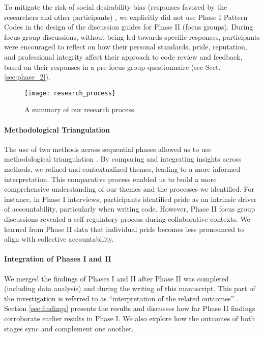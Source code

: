 To mitigate the risk of social desirability bias (responses favored by the researchers and other participants) \citep{furnham1986response}, we explicitly did not use Phase I Pattern Codes in the design of the discussion guides for Phase II (focus groups). During focus group discussions, without being led towards specific responses, participants were encouraged to reflect on how their personal standards, pride, reputation, and professional integrity affect their approach to code review and feedback, based on their responses in a pre-focus group questionnaire (see Sect. \ref{sec:phase_2}).

\begin{figure*}[!t]
    \texttt{[image: research\_process]}
        \caption{A summary of our research process.}
        \label{fig:research_process}
\end{figure*} 

\paragraph*{Methodological Triangulation}

The use of two methods across sequential phases allowed us to use methodological triangulation \citep{perlesz2003methodological}. By comparing and integrating insights across methods, we refined and contextualized themes, leading to a more informed interpretation. This comparative process enabled us to build a more comprehensive understanding of our themes and the processes we identified. For instance, in Phase I interviews, participants identified pride as an intrinsic driver of accountability, particularly when writing code. However, Phase II focus group discussions revealed a self-regulatory process during collaborative contexts. We learned from Phase II data that individual pride becomes less pronounced to align with collective accountability.

\paragraph*{Integration of Phases I and II} We merged the findings of Phases I and II after Phase II was completed (including data analysis) and during the writing of this manuscript. This part of the investigation is referred to as ``interpretation of the related outcomes'' \citep{creswell2017designing}. Section \ref{sec:findings} presents the results and discusses how far Phase II findings corroborate earlier results in Phase I. We also explore how the outcomes of both stages sync and complement one another.

